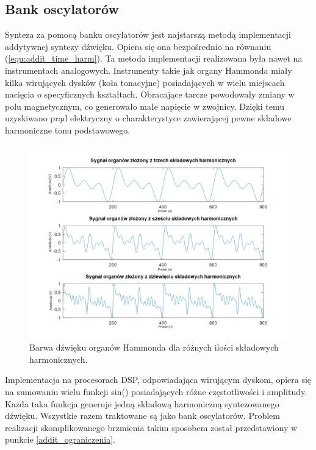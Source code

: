 \subsection{Bank oscylatorów}
Synteza za pomocą banku oscylatorów jest najstarszą metodą implementacji addytywnej syntezy dźwięku. Opiera się ona bezpośrednio na równaniu (\ref{equ:addit_time_harm}).
Ta metoda implementacji realizowana była nawet na instrumentach analogowych. Instrumenty takie jak organy Hammonda miały kilka wirujących dysków (koła tonacyjne) posiadających w wielu miejscach nacięcia o specyficznych kształtach. Obracające tarcze powodowały zmiany w polu magnetycznym, co generowało małe napięcie w zwojnicy. Dzięki temu uzyskiwano prąd elektryczny o charakterystyce zawierającej pewne składowe harmoniczne tonu podstawowego.
\begin{figure}[H]
	\centering
	\includegraphics[width=15cm]{grafiki/add_hammond_matlab}
	\captionsetup{justification=centering}
	\caption{Barwa dźwięku organów Hammonda dla różnych ilości składowych harmonicznych.}
	\label{rys:add_hammond_matlab}
\end{figure}

Implementacja na procesorach DSP, odpowiadająca wirującym dyskom, opiera się na sumowaniu wielu funkcji sin() posiadających różne częstotliwości i amplitudy. Każda taka funkcja generuje jedną składową harmoniczną syntezowanego dźwięku. Wszystkie razem traktowane są jako bank oscylatorów. Problem realizacji skomplikowanego brzmienia takim sposobem został przedstawiony w punkcie \ref{addit_ograniczenia}.

